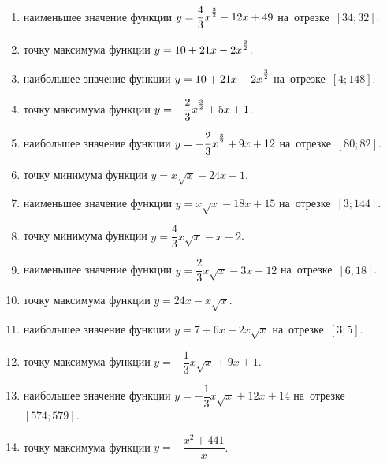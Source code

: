\documentclass[a4paper,10pt]{article}
\begin{document}
\begin{enumerate}
\item {} наименьшее значение функции $y=\dfrac{4}{3}x\strut^{\frac{3}{2}} -12x+49$ на~отрезке~$\left[34;32\right]$.

\item {} точку максимума функции $y=10+21x-2x\strut^{\frac{3}{2}}$.

\item {} наибольшее значение функции $y=10+21x-2x\strut^{\frac{3}{2}}$ на~отрезке~$\left[4;148\right]$.

\item {} точку максимума функции $y=-\dfrac{2}{3}x\strut^{\frac{3}{2}} +5x+1$.

\item {} наибольшее значение функции $y=-\dfrac{2}{3}x\strut^{\frac{3}{2}} +9x+12$ на~отрезке~$\left[80;82\right]$.

\item {} точку минимума функции $y=x\sqrt{x} -24x+1$.







\item {} наименьшее значение функции $y=x\sqrt{x} -18x+15$ на~отрезке~$\left[3;144\right]$.







\item {} точку минимума функции $y=\dfrac{4}{3}x\sqrt{x} -x+2$.

\item {} наименьшее значение функции $y=\dfrac{2}{3}x\sqrt{x} -3x+12$ на~отрезке~$\left[6;18\right]$.

\item {} точку максимума функции $y=24x -x\sqrt{x}$.

\item {} наибольшее значение функции $y=7+6x -2x\sqrt{x}$ на~отрезке~$\left[3;5\right]$.

\item {} точку максимума функции $y=-\dfrac{1}{3}x\sqrt{x} +9x+1$.

\item {} наибольшее значение функции $y=-\dfrac{1}{3}x\sqrt{x} +12x+14$ на~отрезке~$\left[574;579\right]$.

\item {} точку максимума функции $y=-\dfrac{x^2 +441}{x}$.


\end{enumerate}
\end{document}
